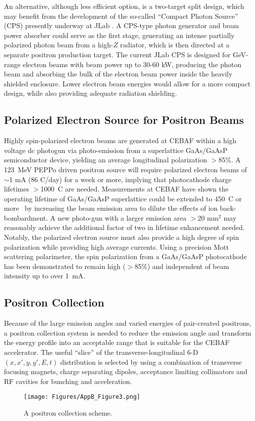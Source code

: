 An alternative, although less efficient option, is a two-target split design, which may benefit from the development of the so-called “Compact Photon Source” (CPS) presently underway at JLab \cite{ali2017workshop}. A CPS-type photon generator and beam power absorber could serve as the first stage, generating an intense partially polarized photon beam from a high-$Z$ radiator, which is then directed at a separate positron production target. The current JLab CPS is designed for GeV-range electron beams with beam power up to 30-60 kW, producing the photon beam and absorbing the bulk of the electron beam power inside the heavily shielded enclosure. Lower electron beam energies would allow for a more compact design, while also providing adequate radiation shielding.

\subsection{Polarized Electron Source for Positron Beams}

Highly spin-polarized electron beams are generated at CEBAF within a high voltage dc photogun via photo-emission from a superlattice GaAs/GaAsP semiconductor device, yielding an average longitudinal polarization $>$85\%.  A 123~MeV PEPPo driven positron source will require polarized electron beams of $\sim$1 mA (86 C/day) for a week or more, implying that photocathode charge lifetimes $>$1000~C are needed. Measurements at CEBAF have shown the operating lifetime of GaAs/GaAsP superlattice could be extended to 450~C or more~\cite{Proceedings:GramesPSTP2017} by increasing the beam emission area to dilute the effects of ion back-bombardment. A new photo-gun with a larger emission area $>$20 mm$^{2}$ may reasonably achieve the additional factor of two in lifetime enhancement needed.  Notably, the polarized electron source must also provide a high degree of spin polarization while providing high average currents.  Using a precision Mott scattering polarimeter, the spin polarization from a GaAs/GaAsP photocathode has been demonstrated to remain high ($>$85\%) and independent of beam intensity up to over 1~mA. 

\subsection{Positron Collection}
Because of the large emission angles and varied energies of pair-created positrons, a positron collection system is needed to reduce the emission angle and transform the energy profile into an acceptable range that is suitable for the CEBAF accelerator. The useful “slice” of the transverse-longitudinal 6-D $(x,x',y,y',E,t)$ distribution is selected by using a combination of transverse focusing magnets, charge separating dipoles, acceptance limiting collimators and RF cavities for bunching and acceleration.
%
\begin{figure}[tbh]
 \centering
 \texttt{[image: Figures/AppB\_Figure3.png]}
 \caption{A positron collection scheme.}
 \label{AppB_Figure3}
\end{figure}

